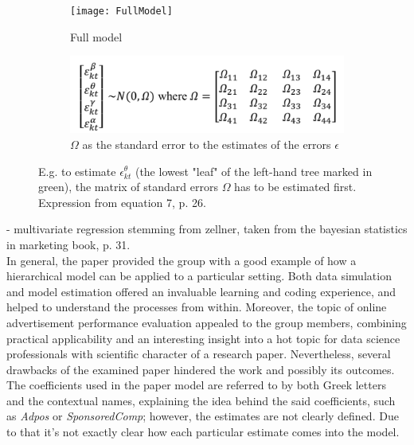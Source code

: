 \begin{figure}
    \begin{subfigure}{0.6\textwidth}
        \texttt{[image: FullModel]} 
        \caption{Full model}
        \label{fig:subFullModel}
    \end{subfigure}
    \begin{subfigure}{0.39\textwidth}
        \includegraphics[width=0.95\linewidth]{omega}
        \caption{$\Omega$ as the standard error to the estimates of the errors $\epsilon$}
        \label{fig:subomega}
    \end{subfigure}
    \caption{E.g. to estimate $\epsilon^{\theta}_{kt}$ (the lowest "leaf" of the left-hand tree marked in green), the matrix of standard errors $\Omega$ has to be estimated first. Expression from equation 7, p. 26.}
    \label{fig:Omegacomparison}
\end{figure}

- multivariate regression stemming from zellner, taken from the bayesian statistics in marketing book, p. 31.\\


In general, the paper provided the group with a good example of how a hierarchical model can be applied to a particular setting. Both data simulation and model estimation offered an invaluable learning and coding experience, and helped to understand the processes from within. Moreover, the topic of online advertisement performance evaluation appealed to the group members, combining practical applicability and an interesting insight into a hot topic for data science professionals with scientific character of a research paper. Nevertheless, several drawbacks of the examined paper hindered the work and possibly its outcomes.\\

The coefficients used in the paper model are referred to by both Greek letters and the contextual names, explaining the idea behind the said coefficients, such as \textit{Adpos} or \textit{SponsoredComp}; however, the estimates are not clearly defined. Due to that it's not exactly clear how each particular estimate comes into the model.\\

